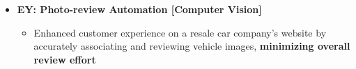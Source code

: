 \documentclass[a4paper,10pt]{article}
\newcommand{\isep}{-2 pt}
\begin{document}
\begin{itemize}
\begin{itemize}


    \end{itemize}

\item \textbf{EY: Photo-review Automation [Computer Vision]} 
\\[-0.6cm]
    \begin{itemize}\itemsep \isep
        \item Enhanced customer experience on a resale car company's website by accurately associating and reviewing vehicle images, \textbf{minimizing overall review effort}


\end{itemize}
\end{itemize}
\end{document}
